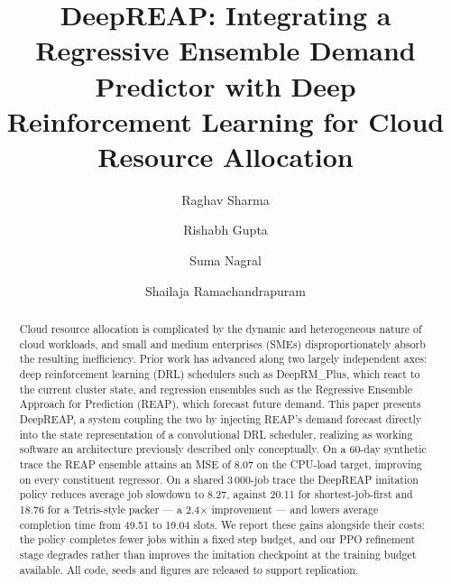 \documentclass[runningheads]{llncs}
\begin{document}
\title{DeepREAP: Integrating a Regressive Ensemble Demand
Predictor with Deep Reinforcement Learning for Cloud Resource
Allocation}


\author{%
Raghav Sharma \and
Rishabh Gupta \and
Suma Nagral \and
Shailaja Ramachandrapuram}



\maketitle

\begin{abstract}
Cloud resource allocation is complicated by the dynamic and
heterogeneous nature of cloud workloads, and small and medium
enterprises (SMEs) disproportionately absorb the resulting
inefficiency. Prior work has advanced along two largely independent
axes: deep reinforcement learning (DRL) schedulers such as
DeepRM\_Plus, which react to the current cluster state, and regression
ensembles such as the Regressive Ensemble Approach for Prediction
(REAP), which forecast future demand. This paper presents DeepREAP, a
system coupling the two by injecting REAP's demand forecast directly
into the state representation of a convolutional DRL scheduler,
realizing as working software an architecture previously described
only conceptually. On a 60-day synthetic trace the REAP ensemble
attains an MSE of 8.07 on the CPU-load target, improving on every
constituent regressor. On a shared 3\,000-job trace the DeepREAP
imitation policy reduces average job slowdown to 8.27, against 20.11
for shortest-job-first and 18.76 for a Tetris-style packer --- a
2.4$\times$ improvement --- and lowers average completion time from
49.51 to 19.04 slots. We report these gains alongside their costs: the
policy completes fewer jobs within a fixed step budget, and our PPO
refinement stage degrades rather than improves the imitation
checkpoint at the training budget available. All code, seeds and
figures are released to support replication.

\end{abstract}
\end{document}
